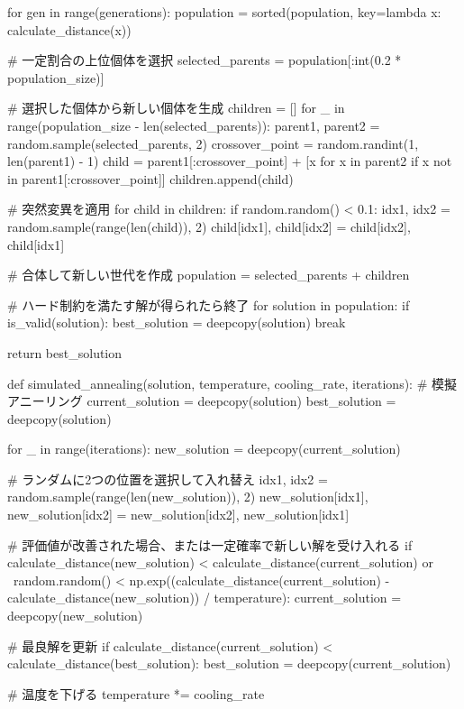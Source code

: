 \documentclass[11pt, twocolumn]{ltjsarticle}
\begin{document}
    for gen in range(generations):
        population = sorted(population, key=lambda x: calculate_distance(x))

        # 一定割合の上位個体を選択
        selected_parents = population[:int(0.2 * population_size)]

        # 選択した個体から新しい個体を生成
        children = []
        for _ in range(population_size - len(selected_parents)):
            parent1, parent2 = random.sample(selected_parents, 2)
            crossover_point = random.randint(1, len(parent1) - 1)
            child = parent1[:crossover_point] + [x for x in parent2 if x not in parent1[:crossover_point]]
            children.append(child)

        # 突然変異を適用
        for child in children:
            if random.random() < 0.1:
                idx1, idx2 = random.sample(range(len(child)), 2)
                child[idx1], child[idx2] = child[idx2], child[idx1]

        # 合体して新しい世代を作成
        population = selected_parents + children

        # ハード制約を満たす解が得られたら終了
        for solution in population:
            if is_valid(solution):
                best_solution = deepcopy(solution)
                break

    return best_solution

def simulated_annealing(solution, temperature, cooling_rate, iterations):
    # 模擬アニーリング
    current_solution = deepcopy(solution)
    best_solution = deepcopy(solution)

    for _ in range(iterations):
        new_solution = deepcopy(current_solution)

        # ランダムに2つの位置を選択して入れ替え
        idx1, idx2 = random.sample(range(len(new_solution)), 2)
        new_solution[idx1], new_solution[idx2] = new_solution[idx2], new_solution[idx1]

        # 評価値が改善された場合、または一定確率で新しい解を受け入れる
        if calculate_distance(new_solution) < calculate_distance(current_solution) or \
           random.random() < np.exp((calculate_distance(current_solution) - calculate_distance(new_solution)) / temperature):
            current_solution = deepcopy(new_solution)

        # 最良解を更新
        if calculate_distance(current_solution) < calculate_distance(best_solution):
            best_solution = deepcopy(current_solution)

        # 温度を下げる
        temperature *= cooling_rate
\end{document}
